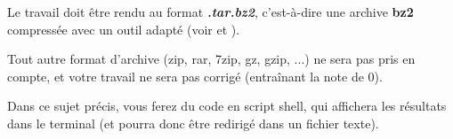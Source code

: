 


\noindent Le travail doit être rendu au format \textbf{\textit{.tar.bz2}}, c'est-à-dire une archive \textbf{bz2} compressée avec un outil adapté (voir  et ).

\noindent Tout autre format d'archive (zip, rar, 7zip, gz, gzip, ...) ne sera pas pris en compte, et votre travail ne sera pas corrigé (entraînant la note de 0).

\vspace*{1cm}

\noindent Dans ce sujet précis, vous ferez du code en script shell, qui affichera les résultats dans le terminal (et pourra donc être redirigé dans un fichier texte).







